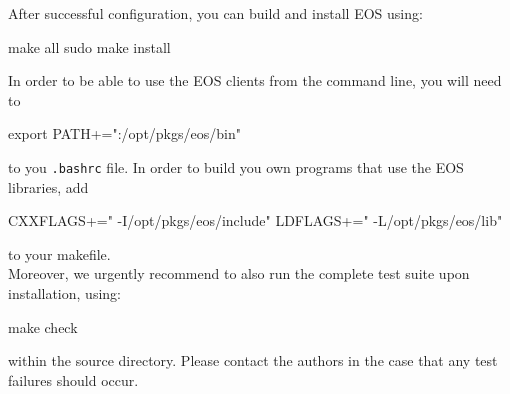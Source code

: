 After successful configuration, you can build and install EOS using:
%
\begin{commandline}
make all
sudo make install
\end{commandline}
%
In order to be able to use the EOS clients from the command line, you will need to
\begin{commandline}
export PATH+=":/opt/pkgs/eos/bin"
\end{commandline}
to you \texttt{.bashrc} file. In order to build you own programs that use the EOS libraries,
add
\begin{commandline}
CXXFLAGS+=" -I/opt/pkgs/eos/include"
LDFLAGS+=" -L/opt/pkgs/eos/lib"
\end{commandline}
to your makefile.\\

Moreover, we urgently recommend to also run the complete test suite upon installation,
using:
%
\begin{commandline}
make check
\end{commandline}
%
within the source directory. Please contact the authors in the case that any test failures should occur.
